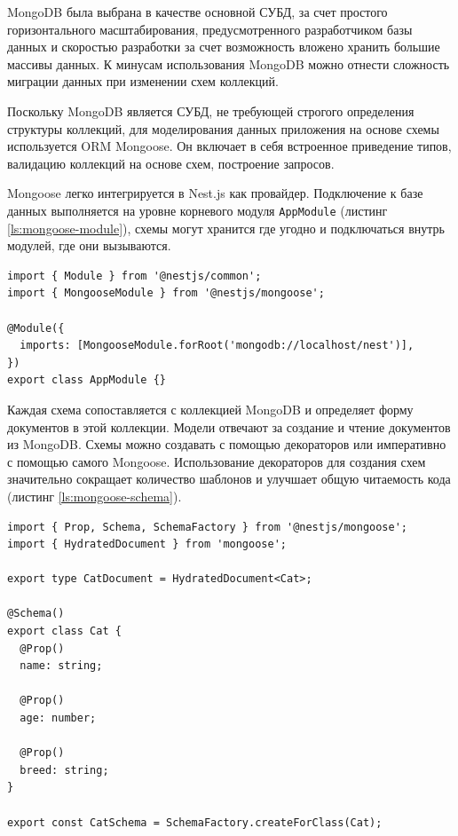 MongoDB была выбрана в качестве основной СУБД, за счет простого горизонтального масштабирования, предусмотренного разработчиком базы данных и скоростью разработки за счет возможность вложено хранить большие массивы данных. К минусам использования MongoDB можно отнести сложность миграции данных при изменении схем коллекций.

Поскольку MongoDB является СУБД, не требующей строгого определения структуры коллекций, для моделирования данных приложения на основе схемы используется ORM Mongoose. Он включает в себя встроенное приведение типов, валидацию коллекций на основе схем, построение запросов.

Mongoose легко интегрируется в Nest.js как провайдер. Подключение к базе данных выполняется на уровне корневого модуля \verb|AppModule| (листинг \ref{ls:mongoose-module}), схемы могут хранится где угодно и подключаться внутрь модулей, где они вызываются.

\begin{lstlisting}[caption={Подключение MongooseModule в приложение Nest.js}, label={ls:mongoose-module}]
import { Module } from '@nestjs/common';
import { MongooseModule } from '@nestjs/mongoose';

@Module({
  imports: [MongooseModule.forRoot('mongodb://localhost/nest')],
})
export class AppModule {}
\end{lstlisting}

Каждая схема сопоставляется с коллекцией MongoDB и определяет форму документов в этой коллекции. Модели отвечают за создание и чтение документов из MongoDB. Схемы можно создавать с помощью декораторов или императивно с помощью самого Mongoose. Использование декораторов для создания схем значительно сокращает количество шаблонов и улучшает общую читаемость кода (листинг \ref{ls:mongoose-schema}).

\begin{lstlisting}[caption={Создание схемы Mongoose}, label={ls:mongoose-schema}]
import { Prop, Schema, SchemaFactory } from '@nestjs/mongoose';
import { HydratedDocument } from 'mongoose';

export type CatDocument = HydratedDocument<Cat>;

@Schema()
export class Cat {
  @Prop()
  name: string;

  @Prop()
  age: number;

  @Prop()
  breed: string;
}

export const CatSchema = SchemaFactory.createForClass(Cat);
\end{lstlisting}

